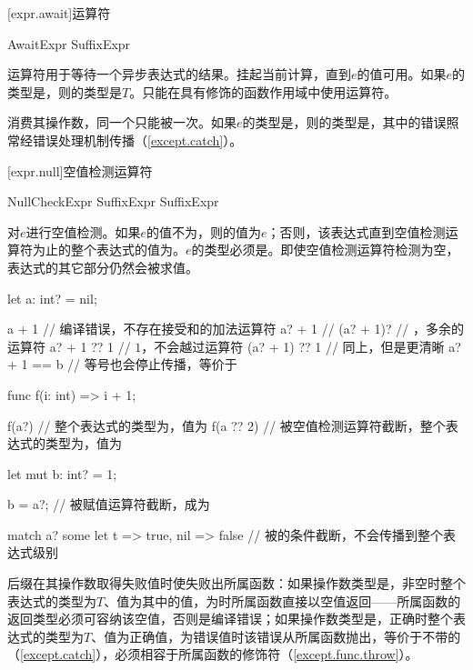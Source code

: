 [expr.await]{运算符}

\begin{bnf}{AwaitExpr}
    SuffixExpr  
\end{bnf}

\pnum
{}运算符用于等待一个异步表达式的结果。挂起当前计算，直到$e$的值可用。如果$e$的类型是，则的类型是$T$。只能在具有修饰的函数作用域中使用运算符。

\pnum
{}消费其操作数，同一个只能被一次。如果$e$的类型是，则的类型是，其中的错误照常经错误处理机制传播（\ref{except.catch}）。

[expr.null]{空值检测运算符}

\begin{bnf}{NullCheckExpr}
    SuffixExpr  \br
    SuffixExpr \terminal{!}
\end{bnf}

\pnum
{}对$e$进行空值检测。如果$e$的值不为，则的值为$e$；否则，该表达式直到空值检测运算符为止的整个表达式的值为。$e$的类型必须是。即使空值检测运算符检测为空，表达式的其它部分仍然会被求值。

\enterexample
\begin{codeblock}
let a: int? = nil;

a + 1 // 编译错误，不存在接受和的加法运算符
a? + 1 // 
(a? + 1)? // ，多余的运算符
a? + 1 ?? 1 // $1$，不会越过运算符
(a? + 1) ?? 1 // 同上，但是更清晰
a? + 1 == b // 等号也会停止传播，等价于

func f(i: int) => i + 1;

f(a?) // 整个表达式的类型为，值为
f(a ?? 2) // 被空值检测运算符截断，整个表达式的类型为，值为

let mut b: int? = 1;

b = a?; // 被赋值运算符截断，成为

match a? { some let t => true, nil => false } // 被的条件截断，不会传播到整个表达式级别
\end{codeblock}
\exitexample

\pnum
后缀\tcode{!}在其操作数取得失败值时使失败出所属函数：如果操作数类型是，非空时整个表达式的类型为$T$、值为其中的值，为时所属函数直接以空值返回——所属函数的返回类型必须可容纳该空值，否则是编译错误；如果操作数类型是，正确时整个表达式的类型为$T$、值为正确值，为错误值时该错误从所属函数抛出，等价于不带的（\ref{except.catch}），必须相容于所属函数的修饰符（\ref{except.func.throw}）。

